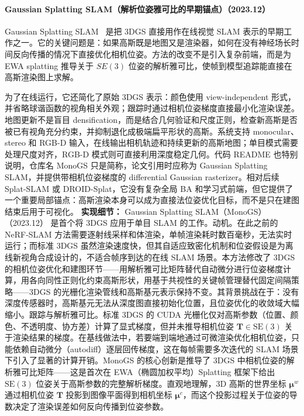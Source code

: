 \paragraph{Gaussian Splatting SLAM（解析位姿雅可比的早期锚点）（2023.12）}
Gaussian Splatting SLAM~\cite{2312_06741} 是把 3DGS 直接用作在线视觉 SLAM 表示的早期工作之一。它的关键问题是：如果高斯既是地图又是渲染器，如何在没有神经场长时间反向传播的情况下直接优化相机位姿。方法的改变不是引入复杂前端，而是为 EWA splatting 推导关于 $SE(3)$ 位姿的解析雅可比，使帧到模型追踪能直接在高斯渲染图上求解。

为了在线运行，它还简化了原始 3DGS 表示：颜色使用 view-independent 形式，并省略球谐函数的视角相关外观；跟踪时通过相机位姿梯度直接最小化渲染误差。地图更新不是盲目 densification，而是结合几何验证和尺度正则，检查新高斯是否被已有视角充分约束，并抑制退化成极端扁平形状的高斯。系统支持 monocular、stereo 和 RGB-D 输入，在线输出相机轨迹和持续更新的高斯地图；单目模式需要处理尺度对齐，RGB-D 模式则可直接利用深度稳定几何。代码 README 也特别说明，仓库名 MonoGS 只是简称，论文引用时应称为 Gaussian Splatting SLAM，并提供带相机位姿梯度的 differential Gaussian rasterizer。相对后续 Splat-SLAM 或 DROID-Splat，它没有复杂全局 BA 和学习式前端，但它提供了一个重要局部锚点：高斯渲染本身可以成为直接法位姿优化目标，而不是只在建图结束后用于可视化。
\textbf{实现细节：} Gaussian Splatting SLAM（MonoGS）（2023.12） 是首个将 3DGS 应用于单目 SLAM 的工作。动机。在此之前的 NeRF-SLAM 方法需要逐射线采样和体渲染，单帧渲染耗时数百毫秒，无法实时运行；而标准 3DGS 虽然渲染速度快，但其自适应致密化机制和位姿假设是为离线新视角合成设计的，不适合帧序到达的在线 SLAM 场景。本方法修改了 3DGS 的相机位姿优化和建图环节——用解析雅可比矩阵替代自动微分进行位姿梯度计算，用各向同性正则化约束高斯形状，用基于共视性的关键帧管理替代固定间隔策略——3DGS 的光栅化渲染管线和高斯基元表示保持不变。其背景挑战在于：没有深度传感器时，高斯基元无法从深度图直接初始化位置，且位姿优化的收敛域大幅缩小。跟踪与解析雅可比。标准 3DGS 的 CUDA 光栅化仅对高斯参数（位置、颜色、不透明度、协方差）计算了显式梯度，但并未推导相机位姿 $\mathbf{T} \in \mathrm{SE}(3)$ 关于渲染结果的梯度。在基线做法中，若要端到端地通过可微渲染优化相机位姿，只能依赖自动微分（autodiff）逐层回传梯度，这在每帧需要多次迭代的 SLAM 场景下引入了显著的计算开销。MonoGS 的核心创新是推导了 3DGS 中相机位姿的解析雅可比矩阵——这是首次在 EWA（椭圆加权平均）Splatting 框架下给出 $\mathrm{SE}(3)$ 位姿关于高斯参数的完整解析梯度。直观地理解，3D 高斯的世界坐标 $\boldsymbol{\mu}^w$ 通过相机位姿 $\mathbf{T}$ 投影到图像平面得到相机坐标 $\boldsymbol{\mu}^c$，而这个投影过程关于位姿的导数决定了渲染误差如何反向传播到位姿参数。
